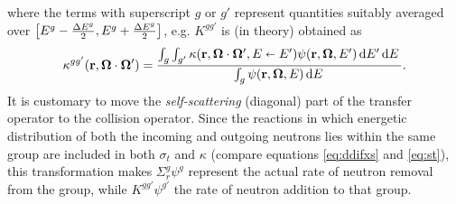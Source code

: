 where the terms with superscript $g$ or $g'$ represent quantities suitably averaged over 
\mbox{$\bigl[E^{g}-\tfrac{\Delta E^{g}}{2}, E^{g}+\tfrac{\Delta E^{g}}{2}\bigr]$}, e.g. $K^{gg'}$ is (in theory) obtained as
\begin{equation}\label{eq:mg-kappa}
	\kappa^{gg'}(\mathbf{r},\mathbf{\Omega}\cdot\mathbf{\Omega}') = \frac{\int_{g}\int_{g'} \kappa(\mathbf{r},\mathbf{\Omega}\cdot\mathbf{\Omega}',E \shortleftarrow
	E')\psi(\mathbf{r},\mathbf{\Omega},E')\,\text{d}E'\,\text{d}E\,}{\int_{g}\psi(\mathbf{r}, \mathbf{\Omega}, E)\,\text{d}E\,}.
\end{equation}
It is customary to move the \textit{self-scattering} (diagonal) part of the
transfer operator to the collision operator. Since the reactions in which energetic distribution of both the incoming 
and outgoing neutrons lies within the same group are included in both $\sigma_t$ and $\kappa$  (compare equations
\eqref{eq:ddifxs} and \eqref{eq:st}), this transformation makes $\Sigma_r^g\psi^g$ represent the actual rate of neutron
removal from the group, while $K^{gg'}\psi^{g'}$ the rate of neutron addition to that group.

